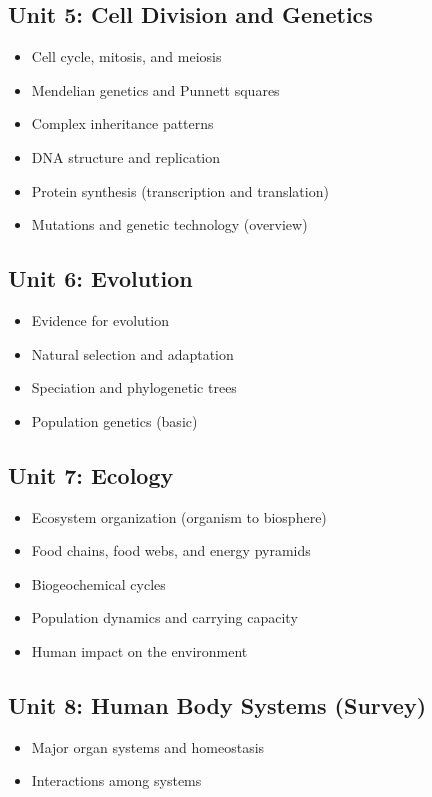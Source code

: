 \documentclass[12pt,oneside]{book}
\begin{document}
\subsection*{Unit 5: Cell Division and Genetics}
\begin{itemize}[leftmargin=2em]
    \item Cell cycle, mitosis, and meiosis
    \item Mendelian genetics and Punnett squares
    \item Complex inheritance patterns
    \item DNA structure and replication
    \item Protein synthesis (transcription and translation)
    \item Mutations and genetic technology (overview)
\end{itemize}

\subsection*{Unit 6: Evolution}
\begin{itemize}[leftmargin=2em]
    \item Evidence for evolution
    \item Natural selection and adaptation
    \item Speciation and phylogenetic trees
    \item Population genetics (basic)
\end{itemize}

\subsection*{Unit 7: Ecology}
\begin{itemize}[leftmargin=2em]
    \item Ecosystem organization (organism to biosphere)
    \item Food chains, food webs, and energy pyramids
    \item Biogeochemical cycles
    \item Population dynamics and carrying capacity
    \item Human impact on the environment
\end{itemize}

\subsection*{Unit 8: Human Body Systems (Survey)}
\begin{itemize}[leftmargin=2em]
    \item Major organ systems and homeostasis
    \item Interactions among systems
\end{itemize}
\end{document}
